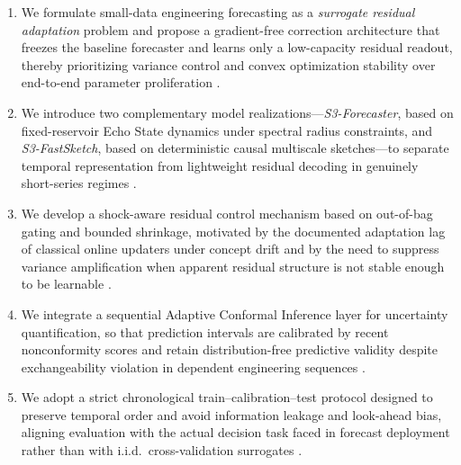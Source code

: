 \documentclass[review,number,sort&compress]{elsarticle}
\begin{document}
\begin{enumerate}
    \item We formulate small-data engineering forecasting as a \emph{surrogate residual adaptation} problem and propose a gradient-free correction architecture that freezes the baseline forecaster and learns only a low-capacity residual readout, thereby prioritizing variance control and convex optimization stability over end-to-end parameter proliferation \cite{zeng2023dlinear,gao2023sedan}.
    \item We introduce two complementary model realizations---\emph{S3-Forecaster}, based on fixed-reservoir Echo State dynamics under spectral radius constraints, and \emph{S3-FastSketch}, based on deterministic causal multiscale sketches---to separate temporal representation from lightweight residual decoding in genuinely short-series regimes \cite{jaeger2004science,armenio2019esn,maass2002reservoir}.
    \item We develop a shock-aware residual control mechanism based on out-of-bag gating and bounded shrinkage, motivated by the documented adaptation lag of classical online updaters under concept drift and by the need to suppress variance amplification when apparent residual structure is not stable enough to be learnable \cite{zhang2023onenet,zhang2024d3a}.
    \item We integrate a sequential Adaptive Conformal Inference layer for uncertainty quantification, so that prediction intervals are calibrated by recent nonconformity scores and retain distribution-free predictive validity despite exchangeability violation in dependent engineering sequences \cite{gibbs2021aci,xu2023spci,angelopoulos2023conformal}.
    \item We adopt a strict chronological train--calibration--test protocol designed to preserve temporal order and avoid information leakage and look-ahead bias, aligning evaluation with the actual decision task faced in forecast deployment rather than with i.i.d.\ cross-validation surrogates \cite{cerqueira2020evaluation,burkner2020lfo}.
\end{enumerate}
\end{document}
